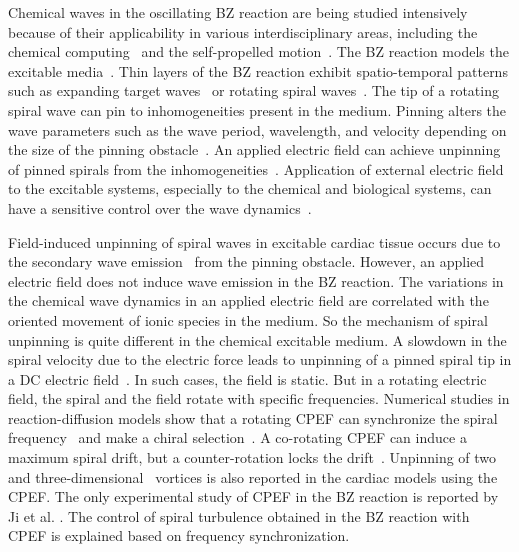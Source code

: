 \documentclass[%
 preprint,
 amsmath,amssymb,
 aps,
]{revtex4-2}
\begin{document}
Chemical waves in the oscillating BZ reaction are being studied intensively because of their applicability in various interdisciplinary areas, including the chemical computing~\cite{gorecki2022information} and the self-propelled motion~\cite{jin2017chemotaxis, ryabchun2022run}. The BZ reaction models the excitable media~\cite{sinha2014patterns}. Thin layers of the BZ reaction exhibit spatio-temporal patterns such as expanding target waves~\cite{zhang2019stability} or rotating spiral waves~\cite{zykov2018spiral}. The tip of a rotating spiral wave can pin to inhomogeneities present in the medium. Pinning alters the wave parameters such as the wave period, wavelength, and velocity depending on the size of the pinning obstacle~\cite{lim2006spiral, sutthiopad2015propagation}. An applied electric field can achieve unpinning of pinned spirals from the inhomogeneities~\cite{jimenez2013electric,punacha2020theory}. 
Application of external electric field to the excitable systems, especially to the chemical and biological systems, can have a sensitive control over the wave dynamics~\cite{steinbock1992electric,bittihn2012negative,feng2022removal}.

Field-induced unpinning of spiral waves in excitable cardiac tissue occurs due to the secondary wave emission~\cite{pumir2007wave} from the pinning obstacle. However, an applied electric field does not induce wave emission in the BZ reaction. The variations in the chemical wave dynamics in an applied electric field are correlated with the oriented movement of ionic species in the medium.
So the mechanism of spiral unpinning is quite different in the chemical excitable medium. A slowdown in the spiral velocity due to the electric force leads to unpinning of a pinned spiral tip in a DC electric field~\cite{dcmechanism}. In such cases, the field is static. But in a rotating electric field, the spiral and the field rotate with specific frequencies.
Numerical studies in reaction-diffusion models show that a rotating CPEF can synchronize the spiral frequency~\cite{chen2009synchronization} and make a chiral selection~\cite{li2013chiral}.
A co-rotating CPEF can induce a maximum spiral drift, but a counter-rotation locks the drift~\cite{chen2006drift}. Unpinning of two~\cite{punacha2020theory} and three-dimensional~\cite{pan2016removal} vortices is also reported in the cardiac models using the CPEF. The only experimental study of CPEF in the BZ reaction is reported by Ji et al. \cite{ji2013experimental}. 
The control of spiral turbulence obtained in the BZ reaction with CPEF is explained based on frequency synchronization. 
 
\end{document}
